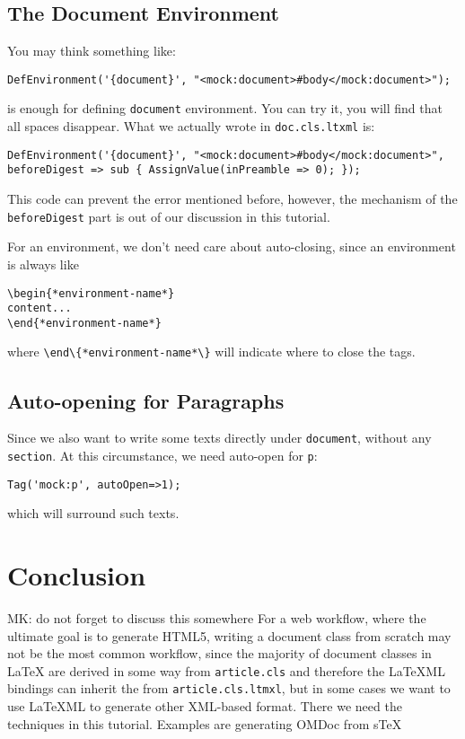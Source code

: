 \documentclass[a4paper]{article}
\def\latexml{{\LaTeX}ML\xspace}
\begin{document}
\subsection{The Document Environment}
You may think something like:
\begin{lstlisting}
DefEnvironment('{document}', "<mock:document>#body</mock:document>");
\end{lstlisting}
is enough for defining \lstinline|document| environment. You can try it, you will find that all spaces disappear. What we actually wrote in \lstinline|doc.cls.ltxml| is:
\begin{lstlisting}
DefEnvironment('{document}', "<mock:document>#body</mock:document>", beforeDigest => sub { AssignValue(inPreamble => 0); });
\end{lstlisting}
This code can prevent the error mentioned before, however, the mechanism of the \lstinline|beforeDigest| part is out of our discussion in this tutorial.

 For an environment, we don't need care about auto-closing, since an environment is always like
\begin{lstlisting}
\begin{*environment-name*}
content...
\end{*environment-name*}
\end{lstlisting}
where \lstinline|\end\{*environment-name*\}| will indicate where to close the tags.

\subsection{Auto-opening for Paragraphs}
Since we also want to write some texts directly under \lstinline|document|, without any \lstinline|section|. At this circumstance, we need auto-open for \lstinline|p|:
\begin{lstlisting}
Tag('mock:p', autoOpen=>1);
\end{lstlisting}
which will surround such texts.

\section{Conclusion}\label{sec:concl}
\begin{newpart}{MK: do not forget to discuss this somewhere}
  For a web workflow, where the ultimate goal is to generate HTML5, writing a document
  class from scratch may not be the most common workflow, since the majority of document
  classes in {\LaTeX} are derived in some way from \lstinline|article.cls| and therefore
  the \latexml bindings can inherit the from \lstinline|article.cls.ltmxl|, but in some
  cases we want to use \latexml to generate other XML-based format. There we need the
  techniques in this tutorial. Examples are generating OMDoc from s\TeX{}
\end{newpart}
\end{document}
